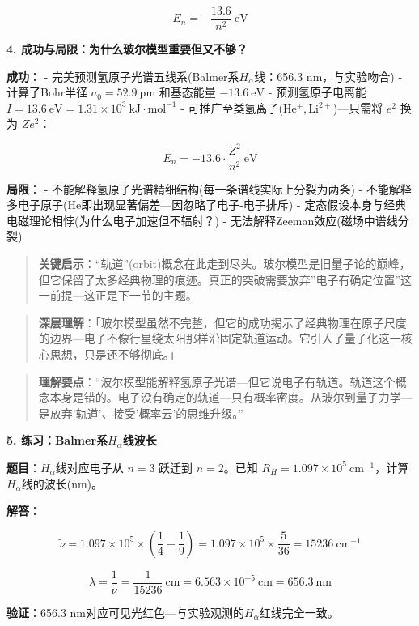 \documentclass[a4paper,11pt]{ctexart}
\newcommand{\箭}{\ensuremath{\rightarrow}}
\newcommand{\左箭}{\ensuremath{\leftarrow}}
\newcommand{\上箭}{\ensuremath{\uparrow}}
\newcommand{\下箭}{\ensuremath{\downarrow}}
\newcommand{\衡}{\ensuremath{\rightleftharpoons}}
\newcommand{\双箭}{\ensuremath{\leftrightarrow}}
\newcommand{\约等于}{\ensuremath{\approx}}
\newcommand{\小于等于}{\ensuremath{\leq}}
\newcommand{\大于等于}{\ensuremath{\geq}}
\newcommand{\不等于}{\ensuremath{\neq}}
\newcommand{\西格马}{\ensuremath{\sigma}}
\newcommand{\派}{\ensuremath{\pi}}
\begin{document}
\[
\boxed{E_n = -\frac{13.6}{n^2}\ \mathrm{eV}}
\]

\textbf{4. 成功与局限：为什么玻尔模型重要但又不够？}

\textbf{成功}：
- 完美预测氢原子光谱五线系(Balmer系\(H_\alpha\)线：656.3 nm，与实验吻合)
- 计算了Bohr半径 \(a_0 = 52.9\ \mathrm{pm}\) 和基态能量 \(-13.6\ \mathrm{eV}\)
- 预测氢原子电离能 \(I = 13.6\ \mathrm{eV} = 1.31 \times 10^3\ \mathrm{kJ\cdot mol^{-1}}\)
- 可推广至类氢离子(\(\mathrm{He^+, Li^{2+}}\))---只需将 \(e^2\) 换为 \(Ze^2\)：

\[E_n = -13.6 \cdot \frac{Z^2}{n^2}\ \mathrm{eV}\]

\textbf{局限}：
- 不能解释氢原子光谱精细结构(每一条谱线实际上分裂为两条)
- 不能解释多电子原子(He即出现显著偏差---因忽略了电子-电子排斥)
- 定态假设本身与经典电磁理论相悖(为什么电子加速但不辐射？)
- 无法解释Zeeman效应(磁场中谱线分裂)

\begin{quote}
\textbf{关键启示}：``轨道''(orbit)概念在此走到尽头。玻尔模型是旧量子论的巅峰，但它保留了太多经典物理的痕迹。真正的突破需要放弃''电子有确定位置''这一前提---这正是下一节的主题。
\end{quote}

\begin{quote}
\textbf{深层理解}：「玻尔模型虽然不完整，但它的成功揭示了经典物理在原子尺度的边界---电子不像行星绕太阳那样沿固定轨道运动。它引入了量子化这一核心思想，只是还不够彻底。」
\end{quote}

\begin{quote}
\textbf{理解要点}：``波尔模型能解释氢原子光谱---但它说电子有轨道。轨道这个概念本身是错的。电子没有确定的轨道---只有概率密度。从玻尔到量子力学---是放弃'轨道'、接受'概率云'的思维升级。''
\end{quote}

\textbf{5. 练习：Balmer系\(H_\alpha\)线波长}

\textbf{题目}：\(H_\alpha\)线对应电子从 \(n=3\) 跃迁到 \(n=2\)。已知 \(R_H = 1.097 \times 10^5\ \mathrm{cm^{-1}}\)，计算\(H_\alpha\)线的波长(nm)。

\textbf{解答}：

\[
\tilde{\nu} = 1.097\times 10^5 \times \left(\frac{1}{4} - \frac{1}{9}\right) = 1.097\times 10^5 \times \frac{5}{36} = 15236\ \mathrm{cm^{-1}}
\]

\[
\lambda = \frac{1}{\tilde{\nu}} = \frac{1}{15236}\ \mathrm{cm} = 6.563\times 10^{-5}\ \mathrm{cm} = 656.3\ \mathrm{nm}
\]

\textbf{验证}：656.3 nm对应可见光红色---与实验观测的\(H_\alpha\)红线完全一致。
\end{document}
